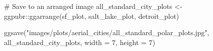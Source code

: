 \documentclass[
  letterpaper,
  DIV=11,
  numbers=noendperiod]{scrreprt}
\newenvironment{Shaded}{\begin{snugshade}}{\end{snugshade}}
\newcommand{\AttributeTok}[1]{\textcolor[rgb]{0.40,0.45,0.13}{#1}}
\newcommand{\CommentTok}[1]{\textcolor[rgb]{0.37,0.37,0.37}{#1}}
\newcommand{\DecValTok}[1]{\textcolor[rgb]{0.68,0.00,0.00}{#1}}
\newcommand{\FunctionTok}[1]{\textcolor[rgb]{0.28,0.35,0.67}{#1}}
\newcommand{\NormalTok}[1]{\textcolor[rgb]{0.00,0.23,0.31}{#1}}
\newcommand{\OtherTok}[1]{\textcolor[rgb]{0.00,0.23,0.31}{#1}}
\newcommand{\SpecialCharTok}[1]{\textcolor[rgb]{0.37,0.37,0.37}{#1}}
\newcommand{\StringTok}[1]{\textcolor[rgb]{0.13,0.47,0.30}{#1}}
\begin{document}
\begin{Shaded}
\begin{Highlighting}[]
\CommentTok{\# Save to an arranged image}
\NormalTok{all\_standard\_city\_plots }\OtherTok{\textless{}{-}}\NormalTok{ ggpubr}\SpecialCharTok{::}\FunctionTok{ggarrange}\NormalTok{(sf\_plot, }
\NormalTok{                                             salt\_lake\_plot, }
\NormalTok{                                             detroit\_plot)}

\FunctionTok{ggsave}\NormalTok{(}\StringTok{"images/plots/aerial\_cities/all\_standard\_polar\_plots.jpg"}\NormalTok{, }
\NormalTok{       all\_standard\_city\_plots, }
       \AttributeTok{width =} \DecValTok{7}\NormalTok{, }
       \AttributeTok{height =} \DecValTok{7}\NormalTok{)}
\end{Highlighting}
\end{Shaded}
\end{document}
